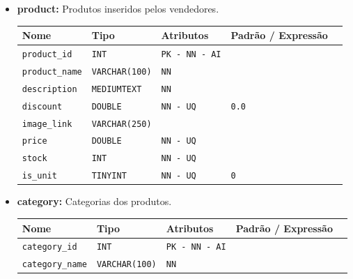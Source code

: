 \begin{itemize}
    \item \textbf{product:}
    Produtos inseridos pelos vendedores. 
    \begin{table}[H]
        \centering
        \begin{tabularx}{\linewidth}{XXXXX}
        \toprule
        \textbf{\color{color_scheme}Nome} & \textbf{\color{color_scheme}Tipo} & \textbf{\color{color_scheme}Atributos} & \textbf{\color{color_scheme}Padrão / Expressão}\\
        \midrule
        \texttt{product\_id} & \texttt{INT} & \texttt{PK - NN - AI} &\\
        \texttt{product\_name} & \texttt{VARCHAR(100)}  & \texttt{NN}  & \\
        \texttt{description} & \texttt{MEDIUMTEXT}  & \texttt{NN}  & \\
        \texttt{discount} & \texttt{DOUBLE}  & \texttt{NN - UQ}  & \texttt{0.0}\\
        \texttt{image\_link} & \texttt{VARCHAR(250)}  &  & \\
        \texttt{price} & \texttt{DOUBLE}  & \texttt{NN - UQ}  & \\
        \texttt{stock} & \texttt{INT}  & \texttt{NN - UQ}  & \\
        \texttt{is\_unit} & \texttt{TINYINT}  & \texttt{NN - UQ} & \texttt{0} \\
        \bottomrule
        \end{tabularx}
        \label{table: product}
    \end{table}

    \vspace{3pt}

    \item \textbf{category:}
    Categorias dos produtos. 
    \begin{table}[H]
        \centering
        \begin{tabularx}{\linewidth}{XXXXX}
        \toprule
        \textbf{\color{color_scheme}Nome} & \textbf{\color{color_scheme}Tipo} & \textbf{\color{color_scheme}Atributos} & \textbf{\color{color_scheme}Padrão / Expressão}\\
        \midrule
        \texttt{category\_id} & \texttt{INT} & \texttt{PK - NN - AI} &\\
        \texttt{category\_name} & \texttt{VARCHAR(100)}  & \texttt{NN}  & \\
        \bottomrule
        \end{tabularx}
        \label{table: categories}
    \end{table}


\end{itemize}
